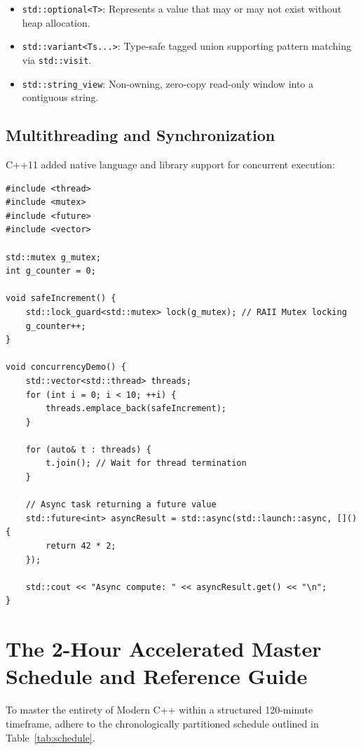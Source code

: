 \documentclass[10pt,journal,compsoc,onecolumn]{IEEEtran}
\begin{document}
\begin{itemize}
    \item \texttt{std::optional<T>}: Represents a value that may or may not exist without heap allocation.
    \item \texttt{std::variant<Ts...>}: Type-safe tagged union supporting pattern matching via \texttt{std::visit}.
    \item \texttt{std::string\_view}: Non-owning, zero-copy read-only window into a contiguous string.
\end{itemize}

\subsection{Multithreading and Synchronization}
C++11 added native language and library support for concurrent execution:

\begin{verbatim}
#include <thread>
#include <mutex>
#include <future>
#include <vector>

std::mutex g_mutex;
int g_counter = 0;

void safeIncrement() {
    std::lock_guard<std::mutex> lock(g_mutex); // RAII Mutex locking
    g_counter++;
}

void concurrencyDemo() {
    std::vector<std::thread> threads;
    for (int i = 0; i < 10; ++i) {
        threads.emplace_back(safeIncrement);
    }

    for (auto& t : threads) {
        t.join(); // Wait for thread termination
    }

    // Async task returning a future value
    std::future<int> asyncResult = std::async(std::launch::async, []() {
        return 42 * 2;
    });

    std::cout << "Async compute: " << asyncResult.get() << "\n";
}
\end{verbatim}

\section{The 2-Hour Accelerated Master Schedule and Reference Guide}
\label{sec:roadmap}

To master the entirety of Modern C++ within a structured 120-minute timeframe, adhere to the chronologically partitioned schedule outlined in Table~\ref{tab:schedule}.
\end{document}
